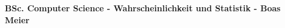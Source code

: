 \documentclass{article}
\begin{document}
\scriptsize

\begin{center}
     \Large{\textbf{BSc. Computer Science - Wahrscheinlichkeit und Statistik - Boas Meier}}
\end{center}

\begin{multicols}{4}
\setlength{\premulticols}{0.5pt}
\setlength{\postmulticols}{0.5pt}
\setlength{\multicolsep}{0.5pt}
\setlength{\columnsep}{0.2pt}
\setlength{\columnseprule}{0.4pt}
\setlength{\intextsep}{0pt}

\setlength{\abovedisplayskip}{0pt}
\setlength{\abovedisplayshortskip}{0pt}
\setlength{\belowdisplayskip}{0pt}
\setlength{\belowdisplayshortskip}{0pt}

\begin{flushleft}











\end{flushleft}
\end{multicols}
\end{document}
